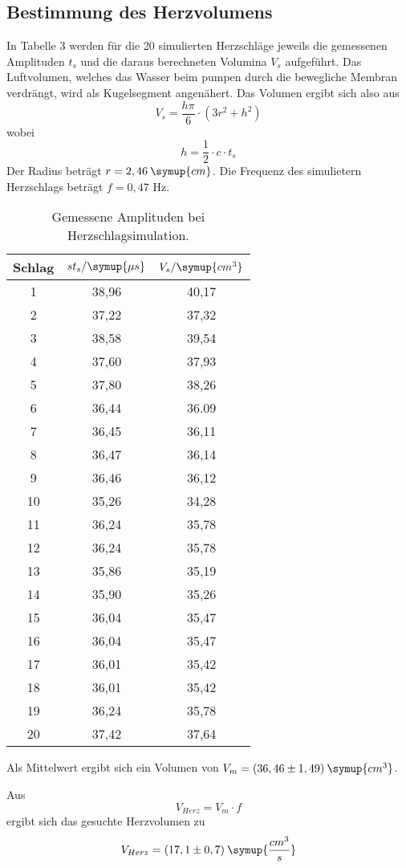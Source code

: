 \subsection{Bestimmung des Herzvolumens}
In Tabelle 3 werden für die 20 simulierten Herzschläge jeweils die gemessenen Amplituden $t_s$ und die daraus berechneten
Volumina $V_s$ aufgeführt. Das Luftvolumen, welches das Wasser beim pumpen durch die bewegliche Membran verdrängt, wird als
Kugelsegment angenähert. Das Volumen ergibt sich also aus
\begin{equation*}
  V_s = \frac{h\pi}{6}\cdot(3r^2 + h^2)
\end{equation*}
wobei
\begin{equation*}
  h = \frac{1}{2}\cdot c \cdot t_s
\end{equation*}
Der Radius beträgt $r = 2,46 \: \symup{cm}$.
Die Frequenz des simulietern Herzschlags beträgt $f = 0,47$ Hz.
\begin{table}[H]
  \centering
  \caption{Gemessene Amplituden bei Herzschlagsimulation.}
  \label{tab:spannung1}
  \begin{tabular}{c c c }
    \toprule
  Schlag & $st_s/\symup{\mu s}$ & $V_s/\symup{cm^3}$ \\
    \midrule
    1  &  38,96 & 40,17     \\
    2  &  37,22 & 37,32     \\
    3  &  38,58 & 39,54     \\
    4  &  37,60 & 37,93     \\
    5  &  37,80 & 38,26     \\
    6  &  36,44 & 36.09     \\
    7  &  36,45 & 36,11     \\
    8  &  36,47 & 36,14     \\
    9  &  36,46 & 36,12     \\
    10 &  35,26 & 34,28      \\
    11 &  36,24 & 35,78     \\
    12  &  36,24 & 35,78     \\
    13  &  35,86 & 35,19     \\
    14  &  35,90 & 35,26     \\
    15  &  36,04 & 35,47     \\
    16  &  36,04 & 35,47     \\
    17  &  36,01 & 35,42     \\
    18  &  36,01 & 35,42     \\
    19  &  36,24 & 35,78     \\
    20  &  37,42 & 37,64     \\
    \bottomrule
  \end{tabular}
\end{table}

Als Mittelwert ergibt sich ein Volumen von $V_{m} = (36,46 \pm 1,49) \: \symup{cm^3}$.

Aus
\begin{equation*}
  V_{Herz} = V_m \cdot f
\end{equation*}
ergibt sich das gesuchte Herzvolumen zu
\begin{equation*}
  V_{Herz} = (17,1 \pm 0,7) \: \symup{\frac{cm^3}{s}}
\end{equation*}
